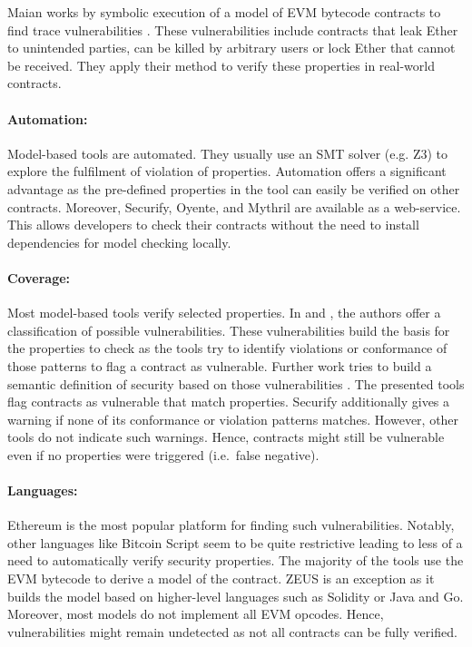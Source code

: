 Maian works by symbolic execution of a model of EVM bytecode contracts to find trace vulnerabilities \cite{Nikolic2018}. These vulnerabilities include contracts that leak Ether to unintended parties, can be killed by arbitrary users or lock Ether that cannot be received. They apply their method to verify these properties in real-world contracts.

\paragraph{Automation:} Model-based tools are automated. They usually use an SMT solver (e.g. Z3) to explore the fulfilment of violation of properties. Automation offers a significant advantage as the pre-defined properties in the tool can easily be verified on other contracts. Moreover, Securify, Oyente, and Mythril are available as a web-service. This allows developers to check their contracts without the need to install dependencies for model checking locally.

\paragraph{Coverage:} Most model-based tools verify selected properties. In \cite{Atzei2017} and \cite{Luu2016}, the authors offer a classification of possible vulnerabilities. These vulnerabilities build the basis for the properties to check as the tools try to identify violations or conformance of those patterns to flag a contract as vulnerable. Further work tries to build a semantic definition of security based on those vulnerabilities \cite{Grishchenko2018}. The presented tools flag contracts as vulnerable that match properties. Securify additionally gives a warning if none of its conformance or violation patterns matches. However, other tools do not indicate such warnings. Hence, contracts might still be vulnerable even if no properties were triggered (i.e.\ false negative).

\paragraph{Languages:} Ethereum is the most popular platform for finding such vulnerabilities. Notably, other languages like Bitcoin Script seem to be quite restrictive leading to less of a need to automatically verify security properties. The majority of the tools use the EVM bytecode to derive a model of the contract. ZEUS is an exception as it builds the model based on higher-level languages such as Solidity or Java and Go. Moreover, most models do not implement all EVM opcodes. Hence, vulnerabilities might remain undetected as not all contracts can be fully verified.


